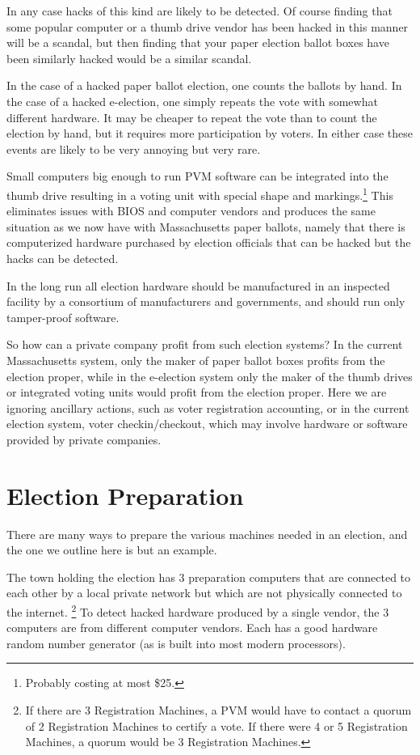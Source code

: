 \documentclass[12pt]{article}
\begin{document}
In any case hacks of this kind are likely to be detected.
Of course finding that some popular computer or a thumb drive
vendor has been hacked in this
manner will be a scandal, but then finding that your paper election
ballot boxes have been similarly hacked would be a similar scandal.

In the case of a hacked paper ballot election, one counts the
ballots by hand.  In the case of a hacked e-election, one simply
repeats the vote with somewhat different hardware.
It may be cheaper to repeat the vote
than to count the election by hand, but it requires more
participation by voters.  In either case these events are likely
to be very annoying but very rare.

Small computers big enough to run PVM software can be integrated
into the thumb drive resulting in a voting unit with special
shape and markings.\footnote{Probably costing at most \$25.}
This eliminates issues with BIOS and computer
vendors and produces the same situation as we now have with
Massachusetts paper ballots, namely that there is computerized
hardware purchased by election officials that can be hacked but
the hacks can be detected.

In the long run all election hardware should be manufactured in an
inspected facility by a consortium of manufacturers and governments,
and should run only tamper-proof software.

So how can a private company profit from such election systems?
In the current Massachusetts system, only the maker of paper ballot
boxes profits from the election proper, while in the e-election
system only the maker of the thumb drives or integrated voting units
would profit from the election proper.  Here we are ignoring
ancillary actions, such as voter registration accounting, or in
the current election system, voter checkin/checkout, which
may involve hardware or software provided by private companies.




\section{Election Preparation}

There are many ways to prepare the various machines needed in an election,
and the one we outline here is but an example.

The town holding the election has 3 preparation computers
that are connected to each other by a local private network but which are not
physically connected to the internet.%
\footnote{If there are 3 Registration Machines,
a PVM would have to contact a quorum of 2 Registration Machines to
certify a vote.  If there were 4 or 5 Registration Machines,
a quorum would be 3 Registration Machines.}
To detect hacked hardware
produced by a single vendor, the 3 computers are from different
computer vendors.  Each has a good hardware random number generator
(as is built into most modern processors).
\end{document}
